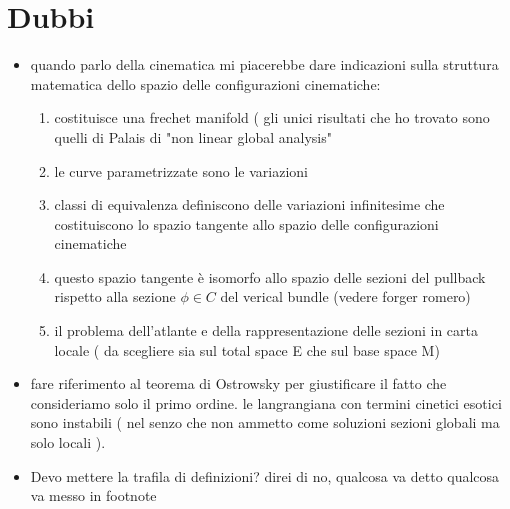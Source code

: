 \documentclass[Main]{subfiles}
\begin{document}
	\section{Dubbi}
	\begin{itemize}
		\item quando parlo della cinematica mi piacerebbe dare indicazioni sulla struttura matematica dello spazio delle configurazioni cinematiche:
			\begin{enumerate}
				\item costituisce una frechet manifold ( gli unici risultati che ho trovato sono quelli di Palais di "non linear global analysis"
				\item le curve parametrizzate sono le variazioni
				\item classi di equivalenza definiscono delle variazioni infinitesime che costituiscono lo spazio tangente allo spazio delle configurazioni cinematiche
				\item questo spazio tangente è isomorfo allo spazio delle sezioni del pullback rispetto alla sezione $\phi\in C$ del verical bundle (vedere forger romero)
				\item il problema dell'atlante e della rappresentazione delle sezioni in carta locale ( da scegliere sia sul total space E che sul base space M)
			\end{enumerate}
		\item fare riferimento al teorema di Ostrowsky per giustificare il fatto che consideriamo solo il primo ordine. le langrangiana con termini cinetici esotici sono instabili ( nel senzo che non ammetto come soluzioni sezioni globali ma solo locali ).

			\item Devo mettere la trafila di definizioni? direi di no, qualcosa va detto qualcosa va messo in footnote
		
			
	\end{itemize}
	
\end{document}
